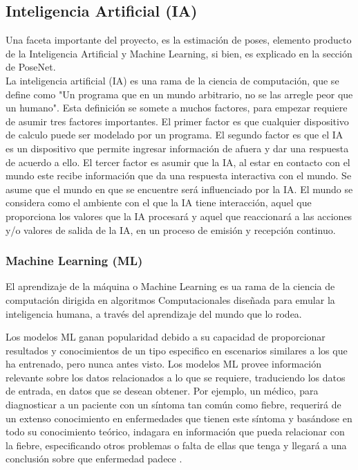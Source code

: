 \subsection{Inteligencia Artificial (IA)}

Una faceta importante del proyecto, es la estimación de poses, elemento producto de la Inteligencia Artificial y Machine Learning, si bien, es explicado en la sección de PoseNet.
\\
La inteligencia artificial (IA) es una rama de la ciencia de computación, que se define como "Un programa que en un mundo arbitrario, no se las arregle peor que un humano"\cite{dobrev2012definition}. 
Esta definición se somete a muchos factores, para empezar requiere de asumir tres factores importantes.
El primer factor es que cualquier dispositivo de calculo puede ser modelado por un programa. El segundo factor es que el IA es un dispositivo que permite ingresar información de afuera y dar una respuesta de acuerdo a ello. El tercer factor es asumir que la IA, al estar en contacto con el mundo este recibe información que da una respuesta interactiva con el mundo. Se asume que el mundo en que se encuentre será influenciado por la IA\cite{dobrev2012definition}. El mundo se considera como el ambiente con el que la IA tiene interacción, aquel que proporciona los valores que la IA procesará y aquel que reaccionará a las acciones y/o valores de salida de la IA, en un proceso de emisión y recepción continuo.

\subsubsection{Machine Learning (ML)}

El aprendizaje de la máquina o Machine Learning es ua rama de la ciencia de computación dirigida en algoritmos Computacionales diseñada para emular la inteligencia humana, a través del aprendizaje del mundo que lo rodea.

Los modelos ML ganan popularidad debido a su capacidad de proporcionar resultados y conocimientos de un tipo especifico en escenarios similares a los que ha entrenado, pero nunca antes visto. Los modelos ML provee información relevante sobre los datos relacionados a lo que se requiere, traduciendo los datos de entrada, en datos que se desean obtener. Por ejemplo, un médico, para diagnosticar a un paciente con un síntoma tan común como fiebre, requerirá de un extenso conocimiento en enfermedades que tienen este síntoma y basándose en todo su conocimiento teórico, indagara en información que pueda relacionar con la fiebre, especificando otros problemas o falta de ellas que tenga y llegará a una conclusión sobre que enfermedad padece \cite{murdoch2019interpretable}.

